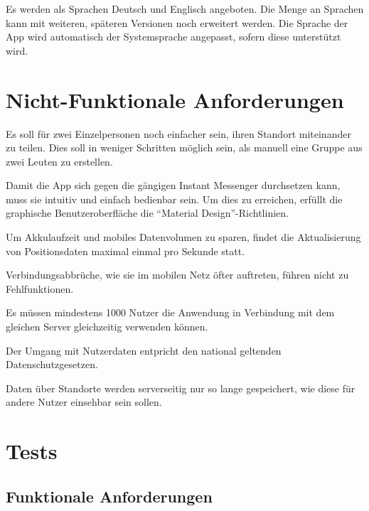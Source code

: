 \documentclass[parskip=full,11pt]{scrartcl}
\begin{document}
Es werden als Sprachen Deutsch und Englisch angeboten.
Die Menge an Sprachen kann mit weiteren, späteren Versionen noch erweitert
werden.
Die Sprache der App wird automatisch der Systemsprache angepasst, sofern diese
unterstützt wird.

\pagebreak
\section{Nicht-Funktionale Anforderungen}

%
Es soll für zwei Einzelpersonen noch einfacher sein, ihren Standort miteinander
zu teilen. Dies soll in weniger Schritten möglich sein, als manuell eine
Gruppe aus zwei Leuten zu erstellen.

Damit die App sich gegen die gängigen Instant Messenger durchsetzen kann, muss
sie intuitiv und einfach bedienbar sein. Um dies zu erreichen, erfüllt die
graphische Benutzeroberfläche die \enquote{Material Design}-Richtlinien.

Um Akkulaufzeit und mobiles Datenvolumen zu sparen, findet die Aktualisierung
von Positionsdaten maximal einmal pro Sekunde statt.

Verbindungsabbrüche, wie sie im mobilen Netz öfter auftreten, führen nicht zu
Fehlfunktionen.

Es müssen mindestens 1000 Nutzer die Anwendung in Verbindung mit dem gleichen
Server gleichzeitig verwenden können.

%
Der Umgang mit Nutzerdaten entpricht den national geltenden
Datenschutzgesetzen.

Daten über Standorte werden serverseitig nur so lange gespeichert, wie diese
für andere Nutzer einsehbar sein sollen.

\pagebreak
\section{Tests}
\subsection{Funktionale Anforderungen}
\end{document}
